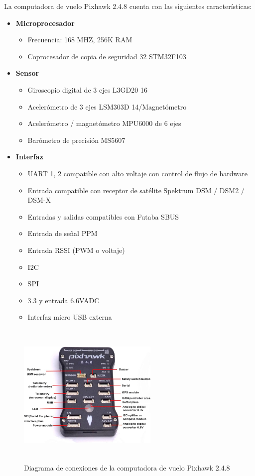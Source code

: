 La computadora de vuelo Pixhawk 2.4.8 cuenta con las siguientes características:
\begin{itemize}[itemsep=0pt, parsep=0pt, topsep=0pt]
    \item \textbf{Microprocesador}
    \begin{itemize}[label=o, itemsep=0pt, parsep=0pt, topsep=0pt, partopsep=0pt]
        \item Frecuencia: 168 MHZ, 256K RAM
        \item Coprocesador de copia de seguridad 32 STM32F103
    \end{itemize}
    \item \textbf{Sensor}
    \begin{itemize}[label=o, itemsep=0pt, parsep=0pt, topsep=0pt, partopsep=0pt]
        \item Giroscopio digital de 3 ejes L3GD20 16
        \item Acelerómetro de 3 ejes LSM303D 14/Magnetómetro
        \item Acelerómetro / magnetómetro MPU6000 de 6 ejes
        \item Barómetro de precisión MS5607
    \end{itemize}
    \item \textbf{Interfaz}
    \begin{itemize}[label=o, itemsep=0pt, parsep=0pt, topsep=0pt, partopsep=0pt]
        \item UART 1, 2 compatible con alto voltaje con control de flujo de hardware
        \item Entrada compatible con receptor de satélite Spektrum DSM / DSM2 / DSM-X
        \item Entradas y salidas compatibles con Futaba SBUS
        \item Entrada de señal PPM
        \item Entrada RSSI (PWM o voltaje) 
        \item I2C 
        \item SPI 
        \item 3.3 y entrada 6.6VADC 
        \item Interfaz micro USB externa
    \end{itemize}
\end{itemize}
\begin{figure}[H]
    \centering
    \includegraphics[width=0.6\textwidth, height=7cm]{imagenes/diagrama-pix.png}
    \caption{Diagrama de conexiones de la computadora de vuelo Pixhawk 2.4.8}
    \label{fig:basetren}
\end{figure}
